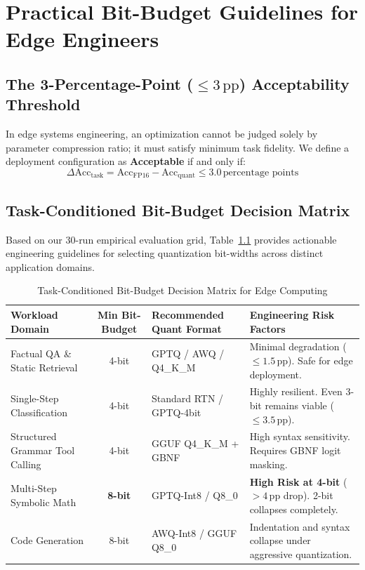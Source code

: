 \documentclass[12pt,a4paper,oneside]{report}
\begin{document}
\chapter{Practical Bit-Budget Guidelines for Edge Engineers}

\section{The 3-Percentage-Point ($\le 3\,\text{pp}$) Acceptability Threshold}
In edge systems engineering, an optimization cannot be judged solely by parameter compression ratio; it must satisfy minimum task fidelity. We define a deployment configuration as \textbf{Acceptable} if and only if:
\begin{equation}
    \Delta\text{Acc}_{\text{task}} = \text{Acc}_{\text{FP16}} - \text{Acc}_{\text{quant}} \le 3.0\,\text{percentage points}
\end{equation}

\section{Task-Conditioned Bit-Budget Decision Matrix}
Based on our 30-run empirical evaluation grid, Table~\ref{tab:bit_guidelines} provides actionable engineering guidelines for selecting quantization bit-widths across distinct application domains.

\begin{table}[h!]
\centering
\caption{Task-Conditioned Bit-Budget Decision Matrix for Edge Computing}
\label{tab:bit_guidelines}
\renewcommand{\arraystretch}{1.2}
\begin{tabular}{p{3.8cm}cp{4.2cm}p{4cm}}
\toprule
\textbf{Workload Domain} & \textbf{Min Bit-Budget} & \textbf{Recommended Quant Format} & \textbf{Engineering Risk Factors} \\
\midrule
Factual QA \& Static Retrieval & 4-bit & GPTQ / AWQ / Q4\_K\_M & Minimal degradation ($\le 1.5\,\text{pp}$). Safe for edge deployment. \\
Single-Step Classification & 4-bit & Standard RTN / GPTQ-4bit & Highly resilient. Even 3-bit remains viable ($\le 3.5\,\text{pp}$). \\
Structured Grammar Tool Calling & 4-bit & GGUF Q4\_K\_M + GBNF & High syntax sensitivity. Requires GBNF logit masking. \\
Multi-Step Symbolic Math & \textbf{8-bit} & GPTQ-Int8 / Q8\_0 & \textbf{High Risk at 4-bit} ($>4\,\text{pp}$ drop). 2-bit collapses completely. \\
Code Generation & 8-bit & AWQ-Int8 / GGUF Q8\_0 & Indentation and syntax collapse under aggressive quantization. \\
\bottomrule
\end{tabular}
\end{table}
\end{document}
